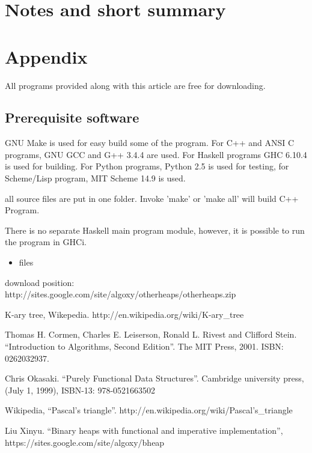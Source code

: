 \documentclass{article}
\begin{document}
\section{Notes and short summary}

\section{Appendix} \label{appendix}
All programs provided along with this article are free for
downloading.

\subsection{Prerequisite software}
GNU Make is used for easy build some of the program. For C++ and ANSI C programs,
GNU GCC and G++ 3.4.4 are used. 
For Haskell programs GHC 6.10.4 is used
for building. For Python programs, Python 2.5 is used for testing, for
Scheme/Lisp program, MIT Scheme 14.9 is used.

all source files are put in one folder. Invoke 'make' or 'make all'
will build C++ Program. 

There is no separate Haskell main program module, however, it is possible to run the program in GHCi.

\begin{itemize}
\item files

\end{itemize}

download position: http://sites.google.com/site/algoxy/otherheaps/otherheaps.zip

\begin{thebibliography}{99}

K-ary tree, Wikepedia. http://en.wikipedia.org/wiki/K-ary\_tree

Thomas H. Cormen, Charles E. Leiserson, Ronald L. Rivest and Clifford Stein. ``Introduction to Algorithms, Second Edition''. The MIT Press, 2001. ISBN: 0262032937.

Chris Okasaki. ``Purely Functional Data Structures''. Cambridge university press, (July 1, 1999), ISBN-13: 978-0521663502

Wikipedia, ``Pascal's triangle''. http://en.wikipedia.org/wiki/Pascal's\_triangle

Liu Xinyu. ``Binary heaps with functional and imperative implementation'', https://sites.google.com/site/algoxy/bheap

\end{thebibliography}

\ifx\wholebook\relax \else
\end{document}
